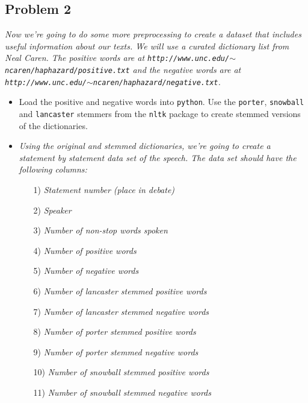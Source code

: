 \documentclass[12pt,letterpaper]{article}
\begin{document}
\subsection*{Problem 2}
\textit{Now we're going to do some more preprocessing to create a dataset that includes useful information about our texts. We will use a curated dictionary list from Neal Caren. The positive words are at {\tt http://www.unc.edu/$\sim$ncaren/haphazard/positive.txt} and the negative words are at {\tt http://www.unc.edu/$\sim$ncaren/haphazard/negative.txt}.}
\begin{itemize}
\item Load the positive and negative words into {\tt python}. Use the {\tt porter}, {\tt snowball} and {\tt lancaster} stemmers from the {\tt nltk} package to create stemmed versions of the dictionaries.



\item \textit{Using the original and stemmed dictionaries, we're going to create a statement by statement data set of the speech.
The data set should have the following columns:}
\begin{itemize}
\item[1)] \textit{Statement number (place in debate)}
\item[2)] \textit{Speaker}
\item[3)] \textit{Number of non-stop words spoken}
\item[4)] \textit{Number of positive words}
\item[5)] \textit{Number of negative words}
\item[6)] \textit{Number of lancaster stemmed positive words}
\item[7)] \textit{Number of lancaster stemmed negative words}
\item[8)] \textit{Number of porter stemmed positive words}
\item[9)] \textit{Number of porter stemmed negative words}
\item[10)] \textit{Number of snowball stemmed positive words}
\item[11)] \textit{Number of snowball stemmed negative words}
\end{itemize}
\end{itemize}
\end{document}
